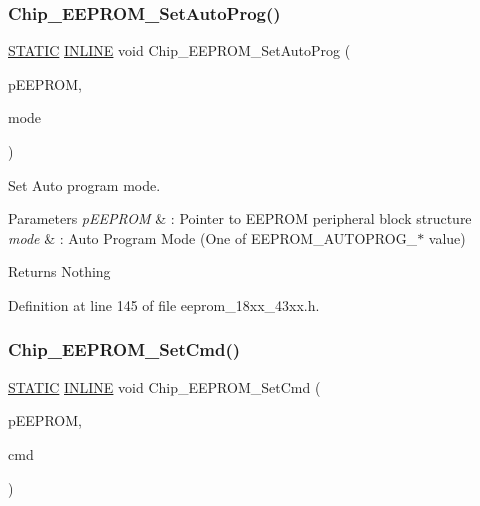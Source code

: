 \subsubsection{\texorpdfstring{Chip\+\_\+\+E\+E\+P\+R\+O\+M\+\_\+\+Set\+Auto\+Prog()}{Chip\_EEPROM\_SetAutoProg()}}
{\footnotesize\ttfamily \hyperlink{group___l_p_c___types___public___macros_ga10b2d890d871e1489bb02b7e70d9bdfb}{S\+T\+A\+T\+IC} \hyperlink{spifi__18xx__43xx_8h_a2eb6f9e0395b47b8d5e3eeae4fe0c116}{I\+N\+L\+I\+NE} void Chip\+\_\+\+E\+E\+P\+R\+O\+M\+\_\+\+Set\+Auto\+Prog (\begin{DoxyParamCaption}\item[{\hyperlink{struct_l_p_c___e_e_p_r_o_m___t}{L\+P\+C\+\_\+\+E\+E\+P\+R\+O\+M\+\_\+T} $\ast$}]{p\+E\+E\+P\+R\+OM,  }\item[{uint32\+\_\+t}]{mode }\end{DoxyParamCaption})}



Set Auto program mode. 


\begin{DoxyParams}{Parameters}
{\em p\+E\+E\+P\+R\+OM} & \+: Pointer to E\+E\+P\+R\+OM peripheral block structure \\
\hline
{\em mode} & \+: Auto Program Mode (One of E\+E\+P\+R\+O\+M\+\_\+\+A\+U\+T\+O\+P\+R\+O\+G\+\_\+$\ast$ value) \\
\hline
\end{DoxyParams}
\begin{DoxyReturn}{Returns}
Nothing 
\end{DoxyReturn}


Definition at line 145 of file eeprom\+\_\+18xx\+\_\+43xx.\+h.

\mbox{\label{group___e_e_p_r_o_m__18_x_x__43_x_x_gaf8f467bf5d3c7141bbad5244a15a889e}} 
\subsubsection{\texorpdfstring{Chip\+\_\+\+E\+E\+P\+R\+O\+M\+\_\+\+Set\+Cmd()}{Chip\_EEPROM\_SetCmd()}}
{\footnotesize\ttfamily \hyperlink{group___l_p_c___types___public___macros_ga10b2d890d871e1489bb02b7e70d9bdfb}{S\+T\+A\+T\+IC} \hyperlink{spifi__18xx__43xx_8h_a2eb6f9e0395b47b8d5e3eeae4fe0c116}{I\+N\+L\+I\+NE} void Chip\+\_\+\+E\+E\+P\+R\+O\+M\+\_\+\+Set\+Cmd (\begin{DoxyParamCaption}\item[{\hyperlink{struct_l_p_c___e_e_p_r_o_m___t}{L\+P\+C\+\_\+\+E\+E\+P\+R\+O\+M\+\_\+T} $\ast$}]{p\+E\+E\+P\+R\+OM,  }\item[{uint32\+\_\+t}]{cmd }\end{DoxyParamCaption})}



